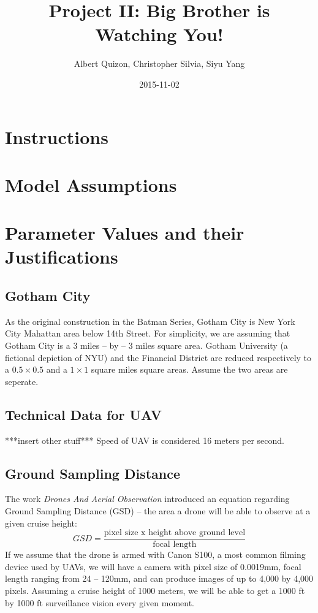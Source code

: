 \documentclass{article}
\title{Project II: Big Brother is Watching You!}
\date{2015-11-02}
\author{Albert Quizon, Christopher Silvia, Siyu Yang}
\begin{document}
\maketitle
\newpage


\section{Instructions}
\section{Model Assumptions}
\section{Parameter Values and their Justifications}
\subsection {Gotham City}
As the original construction in the Batman Series, Gotham City is New York City Mahattan area below 14th Street. For simplicity, we are assuming that Gotham City is a 3 miles – by – 3 miles square area. Gotham University (a fictional depiction of NYU) and the Financial District are reduced respectively to a $0.5 \times 0.5$ and a $1 \times 1$ square miles square areas. Assume the two areas are seperate.
\subsection{Technical Data for UAV}
***insert other stuff***
Speed of UAV is considered 16 meters per second.
\subsection{Ground Sampling Distance}
The work \textit{Drones And Aerial Observation} introduced an equation regarding Ground Sampling Distance (GSD) – the area a drone will be able to observe at a given cruise height:
\begin{equation}
GSD = \frac{\text{pixel size x height above ground level}}{\text{focal length}}
\end{equation}
If we assume that the drone is armed with Canon S100, a most common filming device used by UAVs, we will have a camera with pixel size of 0.0019mm, focal length ranging from 24 – 120mm, and can produce images of up to 4,000 by 4,000 pixels. Assuming a cruise height of 1000 meters, we will be able to get a 1000 ft by 1000 ft surveillance vision every given moment.
\end{document}
